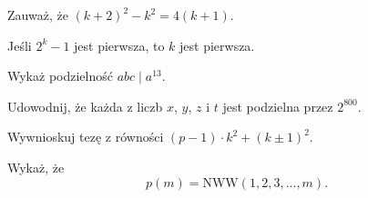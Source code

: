 
\begin{hints_list}
	\item Zauważ, że $(k + 2)^2 - k^2 = 4(k + 1)$. 
	\item Jeśli $2^k - 1$ jest pierwsza, to $k$ jest pierwsza.
	\item Wykaż podzielność $abc \mid a^13$.
	\item Udowodnij, że każda z liczb $x$, $y$, $z$ i $t$ jest podzielna przez $2^{800}$.
	\item Wywnioskuj tezę z równości $(p - 1) \cdot k^2 + (k \pm 1)^2$.
	\item Wykaż, że
	\[
		p(m) = \mathrm{NWW}(1, 2, 3, ..., m).
	\]
\end{hints_list}